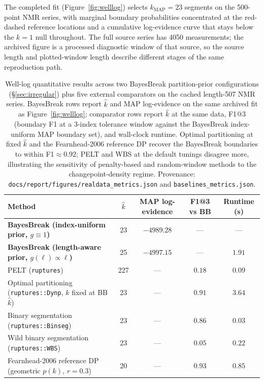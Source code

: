 The completed fit (Figure~\ref{fig:welllog}) selects $k_{\mathrm{MAP}}=23$ segments on the
500-point NMR series, with marginal boundary probabilities concentrated at the
red-dashed reference locations and a cumulative log-evidence curve that stays below the
$k{=}1$ null throughout. The full source series has 4050 measurements; the archived figure is a processed diagnostic window of that source, so the source length and plotted-window length describe different stages of the same reproduction path.

\begin{table}[H]
    \centering
    \begin{tabular}{@{}lcccc@{}}
    \toprule
    Method & $\widehat k$ & MAP log-evidence & F1@3 vs BB & Runtime (s) \\
    \midrule
    \textbf{BayesBreak (index-uniform prior, $g\equiv 1$)} & 23 & $-4989.28$ & --- & --- \\
    \textbf{BayesBreak (length-aware prior, $g(\ell)\propto\ell$)} & 25 & $-4997.15$ & --- & $1.91$ \\
    \midrule
    PELT (\texttt{ruptures}) & 227 & --- & $0.18$ & $0.09$ \\
    Optimal partitioning (\texttt{ruptures::Dynp}, $k$ fixed at BB $\widehat k$) & 23 & --- & $0.91$ & $3.64$ \\
    Binary segmentation (\texttt{ruptures::Binseg}) & 23 & --- & $0.86$ & $0.03$ \\
    Wild binary segmentation (\texttt{ruptures::WBS}) & 23 & --- & $0.05$ & $0.22$ \\
    Fearnhead-2006 reference DP (geometric $p(k)$, $r=0.3$) & 20 & --- & $0.93$ & $0.85$ \\
    \bottomrule
    \end{tabular}
    \caption[Well-log results with external baselines]{Well-log quantitative results across two BayesBreak partition-prior configurations (\S\ref{sec:irregular}) plus five external comparators on the cached length-507 NMR series. BayesBreak rows report \(\widehat k\) and MAP log-evidence on the same archived fit as Figure~\ref{fig:welllog}; comparator rows report \(\widehat k\) at the same data, F1@3 (boundary F1 at a 3-index tolerance window against the BayesBreak index-uniform MAP boundary set), and wall-clock runtime. Optimal partitioning at fixed \(\widehat k\) and the Fearnhead-2006 reference DP recover the BayesBreak boundaries to within F1$\approx 0.92$; PELT and WBS at the default tunings disagree more, illustrating the sensitivity of penalty-based and random-window methods to the changepoint-density regime. Provenance: \texttt{docs/report/figures/realdata\_metrics.json} and \texttt{baselines\_metrics.json}.}
    \label{tab:real_welllog}
\end{table}

